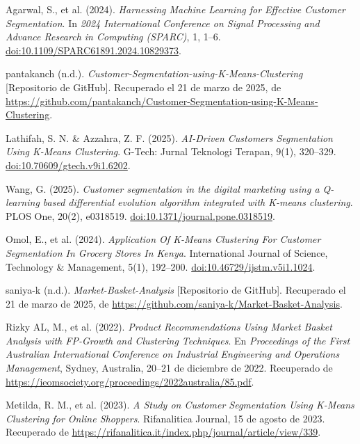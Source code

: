 \documentclass[10pt]{article}
\newcommand{\doi}[1]{\href{https://doi.org/#1}{doi:#1}}
\begin{document}
\begin{thebibliography}{99}
    Agarwal, S., et al. (2024). \textit{Harnessing Machine Learning for Effective Customer Segmentation}. In \textit{2024 International Conference on Signal Processing and Advance Research in Computing (SPARC)}, 1, 1--6. \doi{10.1109/SPARC61891.2024.10829373}.
    
    pantakanch (n.d.). \textit{Customer-Segmentation-using-K-Means-Clustering} [Repositorio de GitHub]. Recuperado el 21 de marzo de 2025, de \url{https://github.com/pantakanch/Customer-Segmentation-using-K-Means-Clustering}.
    
    Lathifah, S. N. \& Azzahra, Z. F. (2025). \textit{AI-Driven Customers Segmentation Using K-Means Clustering}. G-Tech: Jurnal Teknologi Terapan, 9(1), 320--329. \doi{10.70609/gtech.v9i1.6202}.
    
    Wang, G. (2025). \textit{Customer segmentation in the digital marketing using a Q-learning based differential evolution algorithm integrated with K-means clustering}. PLOS One, 20(2), e0318519. \doi{10.1371/journal.pone.0318519}.
    
    Omol, E., et al. (2024). \textit{Application Of K-Means Clustering For Customer Segmentation In Grocery Stores In Kenya}. International Journal of Science, Technology \& Management, 5(1), 192--200. \doi{10.46729/ijstm.v5i1.1024}.
    
    saniya-k (n.d.). \textit{Market-Basket-Analysis} [Repositorio de GitHub]. Recuperado el 21 de marzo de 2025, de \url{https://github.com/saniya-k/Market-Basket-Analysis}.
    
    Rizky AL, M., et al. (2022). \textit{Product Recommendations Using Market Basket Analysis with FP-Growth and Clustering Techniques}. En \textit{Proceedings of the First Australian International Conference on Industrial Engineering and Operations Management}, Sydney, Australia, 20--21 de diciembre de 2022. Recuperado de \url{https://ieomsociety.org/proceedings/2022australia/85.pdf}.
    
    Metilda, R. M., et al. (2023). \textit{A Study on Customer Segmentation Using K-Means Clustering for Online Shoppers}. Rifanalitica Journal, 15 de agosto de 2023. Recuperado de \url{https://rifanalitica.it/index.php/journal/article/view/339}.
    
    \end{thebibliography}
\end{document}
